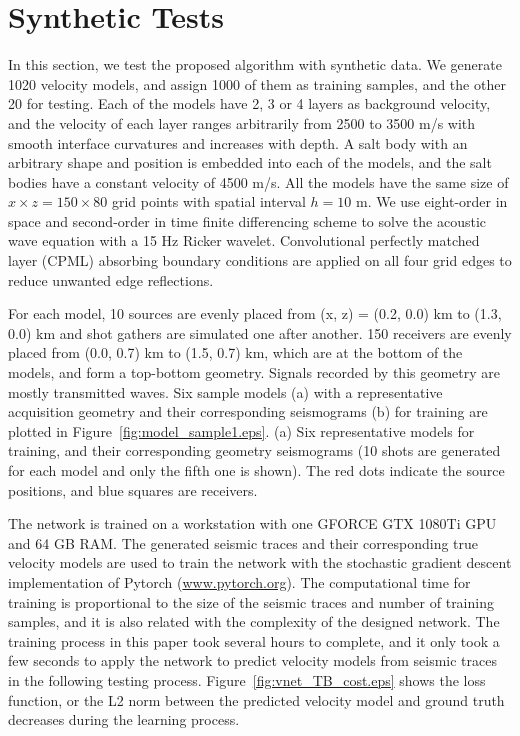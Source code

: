 \documentclass{segabs}
\begin{document}
\section{Synthetic Tests}
In this section, we test the proposed algorithm with synthetic data. 
We generate 1020 velocity models, and assign 1000 of them as training samples, and the other 20 for testing. Each of the models have 2, 3 or 4 layers as background velocity, and the velocity of each layer ranges arbitrarily from 2500 to 3500 m/s with smooth interface curvatures and increases with depth. 
A salt body with an arbitrary shape and position is embedded into each of the models, and the salt bodies have a constant velocity of 4500 m/s. 
 All the models have the same size of $x\times z = 150 \times 80$ grid points with spatial interval $h=10$ m. 
We use eight-order in space and second-order in time finite differencing scheme to solve the acoustic wave equation with a 15 Hz Ricker wavelet.
Convolutional perfectly matched layer (CPML) absorbing boundary conditions \citep{komatitsch07} are applied on all four grid edges to reduce unwanted edge reflections.

For each model, 10 sources are evenly placed from (x, z) = (0.2, 0.0) km to (1.3, 0.0) km and shot gathers are simulated one after another. 
150 receivers are evenly placed from (0.0, 0.7) km to (1.5, 0.7) km, which are at the bottom of the models, and form a top-bottom geometry. Signals recorded by this geometry are mostly transmitted waves. Six sample models (a) with a representative acquisition geometry and their corresponding seismograms (b) for training are plotted in Figure~\ref{fig:model_sample1.eps}. 
{(a) Six representative models for training, and their corresponding geometry seismograms (10 shots are generated for each model and only the fifth one is shown). The red dots indicate the source positions, and blue squares are receivers.}

The network is trained on a workstation with one GFORCE GTX 1080Ti GPU and 64 GB RAM. The generated seismic traces and their corresponding true velocity models are used to train the network with the stochastic gradient descent implementation of Pytorch (\url{www.pytorch.org}). The computational time for training is proportional to the size of the seismic traces and number of training samples, and it is also related with the complexity of the designed network. The training process in this paper took several hours to complete, and it only took a few seconds to apply the network to predict velocity models from seismic traces in the following testing process. Figure~\ref{fig:vnet_TB_cost.eps} shows the loss function, or the L2 norm between the predicted velocity model and ground truth decreases during the learning process. 
\end{document}
